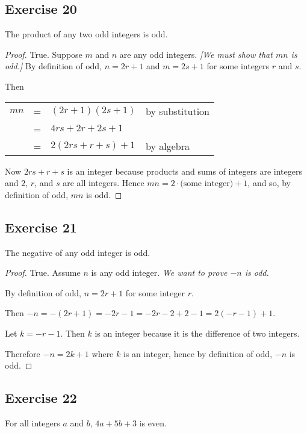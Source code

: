 \documentclass[14pt]{extarticle}
\newcommand{\cy}{\color{cyan}}
\begin{document}
\subsection{Exercise 20}
The product of any two odd integers is odd.

\begin{proof}
    True. Suppose $m$ and $n$ are any odd integers. {\it [We must show that $mn$ is odd.]} By definition of odd, $n = 2r + 1$ and $m = 2s + 1$ for some integers $r$ and $s$.

    Then

    \begin{center}
        \begin{tabular}{rcll}
            $mn$ & = & $(2r+1)(2s+1)$       & \cy by substitution \\
                 & = & $4rs + 2r + 2s + 1$  &                     \\
                 & = & $2(2rs + r + s) + 1$ & \cy by algebra      \\
        \end{tabular}
    \end{center}

    Now $2rs + r + s$ is an integer because products and sums
    of integers are integers and $2$, $r$, and $s$ are all integers. Hence $mn = 2\cdot \text{(some integer)} + 1$, and so, by definition of odd, $mn$ is odd.
\end{proof}

\subsection{Exercise 21}
The negative of any odd integer is odd.

\begin{proof}
    True. Assume $n$ is any odd integer. {\it We want to prove $-n$ is odd.}

    By definition of odd, $n = 2r + 1$ for some integer $r$.

    Then $-n = -(2r+1) = -2r-1 = -2r-2+2-1 = 2(-r-1) + 1$.

    Let $k = -r-1$. Then $k$ is an integer because it is the difference of two integers.

    Therefore $-n = 2k+1$ where $k$ is an integer, hence by definition of odd, $-n$ is odd.
\end{proof}

\subsection{Exercise 22}
For all integers $a$ and $b$, $4a + 5b + 3$ is even.
\end{document}
